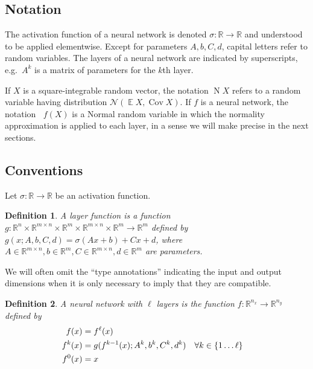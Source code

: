 \documentclass{article}
\newtheorem{definition}{Definition}
\DeclareMathOperator{\expect}{\mathbb{E}}
\DeclareMathOperator{\Cov}{\operatorname{Cov}}
\DeclareMathOperator{\normal}{\mathrm N}
\DeclareMathOperator{\Normal}{\mathrm N^*}
\begin{document}
\subsection{Notation}
The activation function of a neural network is denoted \(\sigma:\mathbb R \to \mathbb R\) and understood to be applied elementwise.
Except for parameters \(A, b, C, d\), capital letters refer to random variables.
The layers of a neural network are indicated by superscripts, e.g.~\(A^k\) is a matrix of parameters for the \(k\)th layer.

If \(X\) is a square-integrable random vector, the notation \(\normal X\) refers to a random variable having distribution \(\mathcal N(\expect X, \Cov X)\).
If \(f\) is a neural network, the notation \(\Normal f(X)\) is a Normal random variable in which the normality approximation is applied to each layer, in a sense we will make precise in the next sections.

\subsection{Conventions}
Let \(\sigma : \mathbb R \to \mathbb R\) be an activation function.

\begin{definition}
    \label{def:layer-function}
    A layer function is a function \(g:\mathbb R^n \times \mathbb R^{m \times n} \times \mathbb R^m \times \mathbb R^{m \times n} \times \mathbb R^m \to \mathbb R^m\) defined by \(g(x; A, b, C, d) = \sigma(A x + b) + C x + d\), where \(A \in \mathbb R^{m \times n}, b \in \mathbb R^m, C \in \mathbb R^{m \times n}, d \in \mathbb R^m\) are parameters.
\end{definition}

We will often omit the ``type annotations'' indicating the input and output dimensions when it is only necessary to imply that they are compatible.

\begin{definition}
    \label{def:neural-network}
    A neural network with \(\ell \) layers is the function \(f: \mathbb R^{n_x} \to \mathbb R^{n_y}\) defined by
    \begin{align*}
        f(x) &= f^\ell(x) \\
        f^k(x) &= g(f^{k-1}(x); A^k, b^k, C^k, d^k) & \forall k &\in \cbr{1 \ldots \ell} \\
        f^0(x) &= x
    \end{align*}
\end{definition}
\end{document}

